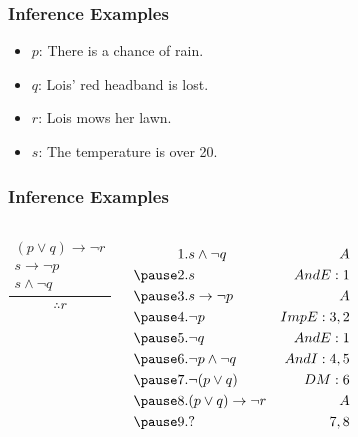 \documentclass[dvipsnames]{beamer}
\begin{document}
\begin{frame}
  \frametitle{Inference Examples}

  \begin{example}
    \begin{itemize}
      \item $p$: There is a chance of rain.
      \item $q$: Lois' red headband is lost.
      \item $r$: Lois mows her lawn.
      \item $s$: The temperature is over 20\textcelsius.
    \end{itemize}
  \end{example}
\end{frame}

\begin{frame}
  \frametitle{Inference Examples}

  \begin{example}
    \begin{columns}
      \[
      \frac
        {
          \begin{array}{c}
            (p \vee q) \rightarrow \neg r\\
            s \rightarrow \neg p\\
            s \wedge \neg q
          \end{array}
        }
        {
          \therefore r
        }
      \]

      \pause
      \begin{eqnarray*}
        1. & s \wedge \neg q                & A\\
        \pause
        2. & s                              & AndE:1\\
        \pause
        3. & s \rightarrow \neg p           & A\\
        \pause
        4. & \neg p                         & ImpE:3,2\\
        \pause
        5. & \neg q                         & AndE:1\\
        \pause
        6. & \neg p \wedge \neg q           & AndI:4,5\\
        \pause
        7. & \neg (p \vee q)                & DM:6\\
        \pause
        8. & (p \vee q) \rightarrow \neg r  & A\\
        \pause
        9. & ?                              & 7,8
      \end{eqnarray*}
    \end{columns}
  \end{example}
\end{frame}
\end{document}
